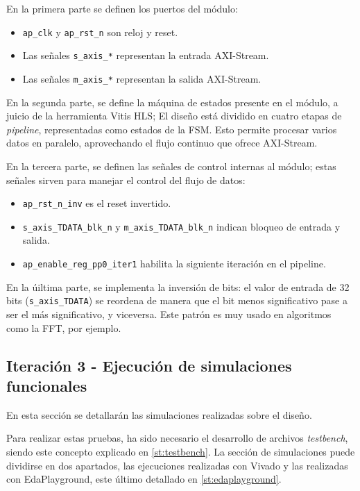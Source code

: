 \begin{adjustwidth}{1.5cm}{}
En la primera parte se definen los puertos del módulo:

\begin{itemize}
  \item \texttt{ap\_clk} y \texttt{ap\_rst\_n} son reloj y reset.
  \item Las señales \texttt{s\_axis\_*} representan la entrada AXI-Stream.
  \item Las señales \texttt{m\_axis\_*} representan la salida AXI-Stream.
\end{itemize}

En la segunda parte, se define la máquina de estados presente en el módulo, a juicio de la herramienta Vitis HLS; El diseño está dividido en cuatro etapas de \textit{pipeline}, representadas como estados de la FSM. Esto permite procesar varios datos en paralelo, aprovechando el flujo continuo que ofrece AXI-Stream.

En la tercera parte, se definen las señales de control internas al módulo; estas señales sirven para manejar el control del flujo de datos:
\begin{itemize}
  \item \texttt{ap\_rst\_n\_inv} es el reset invertido.
  \item \texttt{s\_axis\_TDATA\_blk\_n} y \texttt{m\_axis\_TDATA\_blk\_n} indican bloqueo de entrada y salida.
  \item \texttt{ap\_enable\_reg\_pp0\_iter1} habilita la siguiente iteración en el pipeline.
\end{itemize}

En la úiltima parte, se implementa la inversión de bits: el valor de entrada de 32 bits (\texttt{s\_axis\_TDATA}) se reordena de manera que el bit menos significativo pase a ser el más significativo, y viceversa. Este patrón es muy usado en algoritmos como la \ac{FFT}, por ejemplo.

\end{adjustwidth}

\subsection{Iteración 3 - Ejecución de simulaciones funcionales}
En esta sección se detallarán las simulaciones realizadas sobre el diseño. 

Para realizar estas pruebas, ha sido necesario el desarrollo de archivos \emph{testbench}, siendo este concepto explicado en \ref{st:testbench}. La sección de simulaciones puede dividirse en dos apartados, las ejecuciones realizadas con Vivado y las realizadas con EdaPlayground, este último detallado en \ref{st:edaplayground}.

